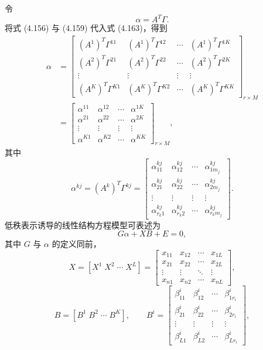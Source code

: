 令
\begin{equation}
\alpha=A^T\Gamma.
\tag{4.163}
\end{equation}
将式 (4.156) 与 (4.159) 代入式 (4.163)，得到
\begin{equation}
\begin{aligned}
\alpha&=\begin{bmatrix}
(A^1)^T\Gamma^{11}&(A^1)^T\Gamma^{12}&\cdots&(A^1)^T\Gamma^{1K}\\
(A^2)^T\Gamma^{21}&(A^2)^T\Gamma^{22}&\cdots&(A^2)^T\Gamma^{2K}\\
\vdots&\vdots&\vdots&\vdots\\
(A^K)^T\Gamma^{K1}&(A^K)^T\Gamma^{K2}&\cdots&(A^K)^T\Gamma^{KK}
\end{bmatrix}_{r\times M}\\
&=\begin{bmatrix}
\alpha^{11}&\alpha^{12}&\cdots&\alpha^{1K}\\
\alpha^{21}&\alpha^{22}&\cdots&\alpha^{2K}\\
\vdots&\vdots&\vdots&\vdots\\
\alpha^{K1}&\alpha^{K2}&\cdots&\alpha^{KK}
\end{bmatrix}_{r\times M},
\end{aligned}
\tag{4.164}
\end{equation}
其中
\begin{equation}
\alpha^{kj}=(A^k)^T\Gamma^{kj}
=\begin{bmatrix}
\alpha_{11}^{kj}&\alpha_{12}^{kj}&\cdots&\alpha_{1m_j}^{kj}\\
\alpha_{21}^{kj}&\alpha_{22}^{kj}&\cdots&\alpha_{2m_j}^{kj}\\
\vdots&\vdots&\vdots&\vdots\\
\alpha_{r_k1}^{kj}&\alpha_{r_k2}^{kj}&\cdots&\alpha_{r_km_j}^{kj}
\end{bmatrix}.
\tag{4.165}
\end{equation}
低秩表示诱导的线性结构方程模型可表述为
\begin{equation}
G\alpha+XB+E=0,
\tag{4.166}
\end{equation}
其中 $G$ 与 $\alpha$ 的定义同前，
\[
X=[X^1\;X^2\;\cdots\;X^L]
=\begin{bmatrix}x_{11}&x_{12}&\cdots&x_{1L}\\x_{21}&x_{22}&\cdots&x_{2L}\\\vdots&\vdots&\ddots&\vdots\\x_{n1}&x_{n2}&\cdots&x_{nL}\end{bmatrix},
\]
\[
B=[B^1\;B^2\;\cdots\;B^K],\qquad
B^i=\begin{bmatrix}
\beta_{11}^i&\beta_{12}^i&\cdots&\beta_{1r_i}^i\\
\beta_{21}^i&\beta_{22}^i&\cdots&\beta_{2r_i}^i\\
\vdots&\vdots&\vdots&\vdots\\
\beta_{L1}^i&\beta_{L2}^i&\cdots&\beta_{Lr_i}^i
\end{bmatrix},
\]

